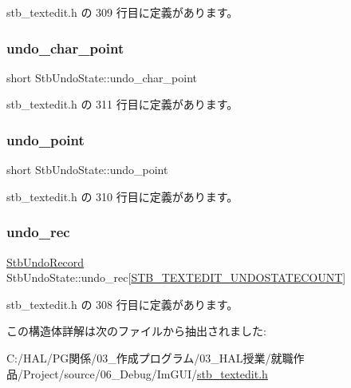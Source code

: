  stb\+\_\+textedit.\+h の 309 行目に定義があります。

\mbox{\label{struct_stb_undo_state_ad5c08b1f8c24678c44407f0ca805afcf}} 
\subsubsection{\texorpdfstring{undo\+\_\+char\+\_\+point}{undo\_char\_point}}
{\footnotesize\ttfamily short Stb\+Undo\+State\+::undo\+\_\+char\+\_\+point}



 stb\+\_\+textedit.\+h の 311 行目に定義があります。

\mbox{\label{struct_stb_undo_state_ad29a8695b3e8252ac164d0c2d0be7d7c}} 
\subsubsection{\texorpdfstring{undo\+\_\+point}{undo\_point}}
{\footnotesize\ttfamily short Stb\+Undo\+State\+::undo\+\_\+point}



 stb\+\_\+textedit.\+h の 310 行目に定義があります。

\mbox{\label{struct_stb_undo_state_a8cb07be8f304d1620b50bd024709023f}} 
\subsubsection{\texorpdfstring{undo\+\_\+rec}{undo\_rec}}
{\footnotesize\ttfamily \mbox{\hyperlink{struct_stb_undo_record}{Stb\+Undo\+Record}} Stb\+Undo\+State\+::undo\+\_\+rec\mbox{[}\mbox{\hyperlink{stb__textedit_8h_afa79483143df87a1497010712b3dfaf9}{S\+T\+B\+\_\+\+T\+E\+X\+T\+E\+D\+I\+T\+\_\+\+U\+N\+D\+O\+S\+T\+A\+T\+E\+C\+O\+U\+NT}}\mbox{]}}



 stb\+\_\+textedit.\+h の 308 行目に定義があります。



この構造体詳解は次のファイルから抽出されました\+:\begin{DoxyCompactItemize}
\item 
C\+:/\+H\+A\+L/\+P\+G関係/03\+\_\+作成プログラム/03\+\_\+\+H\+A\+L授業/就職作品/\+Project/source/06\+\_\+\+Debug/\+Im\+G\+U\+I/\mbox{\hyperlink{stb__textedit_8h}{stb\+\_\+textedit.\+h}}\end{DoxyCompactItemize}
